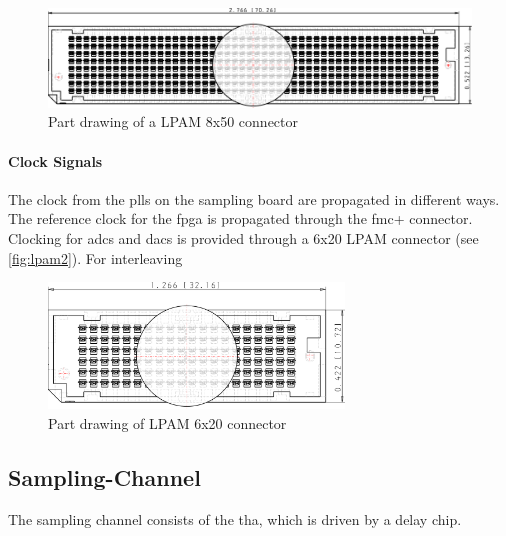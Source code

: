 \begin{figure}[tbh]
	\centering
	\includegraphics[width = \textwidth]{chap/04-work/img/lpam_50_top.pdf}
	\caption[LPAM 8x50 connector]{Part drawing of a LPAM 8x50 connector}
	\label{fig:lpam1}
\end{figure}


\paragraph{Clock Signals}
The clock from the \glspl{pll} on the sampling board are propagated in different ways. The reference clock for the \gls{fpga} is propagated through the \gls{fmc}+ connector. Clocking for \glspl{adc} and \glspl{dac} is provided through a 6x20 LPAM connector (see \autoref{fig:lpam2}). For interleaving 


\begin{figure}[tbh]
	\centering
	\includegraphics[width = 0.7\textwidth]{chap/04-work/img/lpam_20.pdf}
	\caption[LPAM 6x20 connector]{Part drawing of LPAM 6x20 connector}
	\label{fig:lpam2}
\end{figure}




\subsection{Sampling-Channel}
The sampling channel consists of the \gls{tha}, which is driven by a delay chip. 

